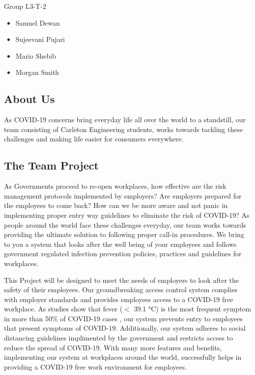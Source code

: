 Group L3-T-2
\begin{itemize}
    \item Samuel Dewan
    \item Sujeevani Pujari 
    \item Mario Shebib 
    \item Morgan Smith
\end{itemize}

\subsection{About Us}

As COVID-19 concerns bring everyday life all over the world to a standstill, our
team consisting of Carleton Engineering students, works towards tackling these
challenges and making life easier for consumers everywhere.

\subsection{The Team Project} 

As Governments proceed to re-open workplaces, how effective are the risk
management protocols implemented by employers? Are employers prepared for the
employees to come back? How can we be more aware and not panic in implementing
proper entry way guidelines to eliminate the risk of COVID-19? As people
around the world face these challenges everyday, our team works towards
providing the ultimate solution to following proper call-in procedures. We bring
to you a system that looks after the well being of your employees and follows
government regulated infection prevention policies, practices and guidelines for
workplaces. 

This Project will be designed to meet the needs of employers to look after the
safety of their employees. Our groundbreaking access control system complies
with employer standards and provides employees access to a COVID-19 free
workplace. As studies show that fever ($<$ 39.1 °C) is the most frequent symptom
in more than 50\% of COVID-19 cases \cite{Michelen_2020}, our system prevents
entry to employees that present symptoms of COVID-19. Additionally, our system
adheres to social distancing guidelines implimented by the government and
restricts access to reduce the spread of COVID-19. With many more features and
benefits, implementing our system at workplaces around the world, successfully
helps in providing a COVID-19 free work environment for employees. 

